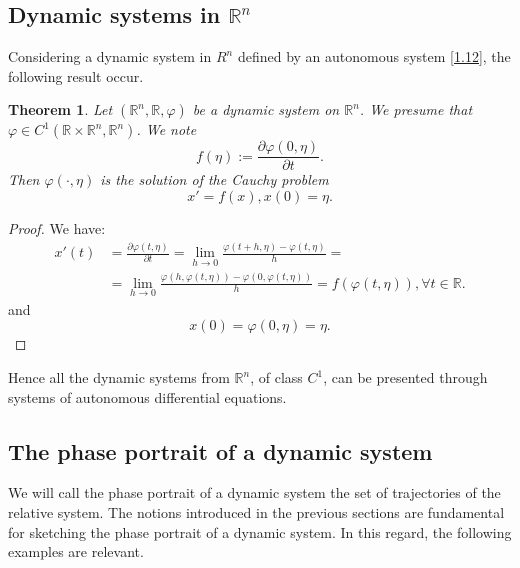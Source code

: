 \documentclass[a4paper,12pt]{report}
\newtheorem{theorem}{Theorem}[subsection]
\newcommand{\R}{\mathbb{R}}
\begin{document}
\subsection{Dynamic systems in $\R^{n}$}
 Considering a dynamic system in $R^{n}$ defined by an autonomous system \eqref{1.12}, the following result occur.
 \begin{theorem}
  Let $(\R^{n},\R,\varphi)$ be a dynamic system on $\R^{n}$. We presume that $\varphi\in C^{1}(\R\times\R^{n},\R^{n})$. We note $$f(\eta):=\frac{\partial \varphi(0,\eta)}{\partial t}.$$ Then $\varphi(\cdot,\eta)$ is the solution of the Cauchy problem 
  \begin{equation}\label{1.14}
   x'=f(x),x(0)=\eta.
  \end{equation}

 \end{theorem}
\begin{proof}
 We have:
 \begin{align*}
  x'(t)&=\frac{\partial \varphi(t,\eta)}{\partial t}=\lim_{h\rightarrow 0}\frac{\varphi(t+h,\eta)-\varphi(t,\eta)}{h}= \\
       &=\lim_{h\rightarrow 0}\frac{\varphi(h,\varphi(t,\eta))-\varphi(0,\varphi(t,\eta))}{h}=f(\varphi(t,\eta)), \forall t\in \R.  
 \end{align*}
and $$x(0)=\varphi(0,\eta)=\eta.$$
\end{proof}
Hence all the dynamic systems from $\R^{n}$, of class $C^{1}$, can be presented through systems of autonomous differential equations.
\subsection{The phase portrait of a dynamic system}
 We will call the phase portrait of a dynamic system the set of trajectories of the relative system. The notions introduced in the previous sections are fundamental for sketching the phase portrait of a dynamic system. In this regard, the following examples are relevant.
\end{document}
